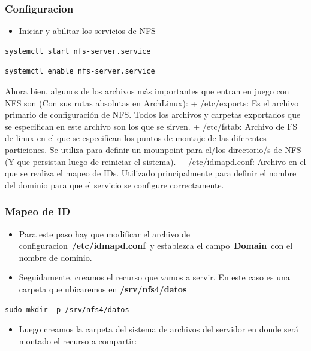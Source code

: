 \documentclass[12pt]{extarticle}
\providecommand{\tightlist}{%
      \setlength{\itemsep}{0pt}\setlength{\parskip}{0pt}}
\begin{document}
\subsubsection{Configuracion}\label{configuracion}

\begin{itemize}
\tightlist
\item
  Iniciar y abilitar los servicios de NFS
\end{itemize}

\begin{verbatim}
systemctl start nfs-server.service
\end{verbatim}

\begin{verbatim}
systemctl enable nfs-server.service
\end{verbatim}

Ahora bien, algunos de los archivos más importantes que entran en juego
con NFS son (Con sus rutas absolutas en ArchLinux): + /etc/exports: Es
el archivo primario de configuración de NFS. Todos los archivos y
carpetas exportados que se especifican en este archivo son los que se
sirven. + /etc/fstab: Archivo de FS de linux en el que se especifican
los puntos de montaje de las diferentes particiones. Se utiliza para
definir un mounpoint para el/los directorio/s de NFS (Y que persistan
luego de reiniciar el sistema). + /etc/idmapd.conf: Archivo en el que se
realiza el mapeo de IDs. Utilizado principalmente para definir el nombre
del dominio para que el servicio se configure correctamente.

\subsubsection{Mapeo de ID}\label{mapeo-de-id}

\begin{itemize}
\item
  Para este paso hay que modificar el archivo de
  configuracion~\textbf{/etc/idmapd.conf}~y establezca el
  campo~\textbf{Domain}~con el nombre de dominio.
\item
  Seguidamente, creamos el recurso que vamos a servir. En este caso es
  una carpeta que ubicaremos en \textbf{/srv/nfs4/datos}
\end{itemize}

\begin{verbatim}
sudo mkdir -p /srv/nfs4/datos
\end{verbatim}

\begin{itemize}
\tightlist
\item
  Luego creamos la carpeta del sistema de archivos del servidor en donde
  será montado el recurso a compartir:
\end{itemize}
\end{document}
